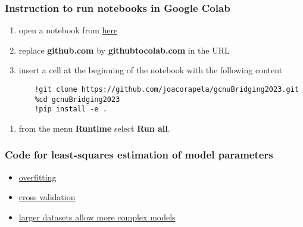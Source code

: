 \documentclass[11pt]{beamer}
\newcounter{saveenumi}
\newcommand{\seti}{\setcounter{saveenumi}{\value{enumi}}}
\newcommand{\conti}{\setcounter{enumi}{\value{saveenumi}}}
\begin{document}
\begin{frame}[fragile]
    \frametitle{Instruction to run notebooks in Google Colab}

    \begin{enumerate}
        \item open a notebook from
            \href{https://github.com/joacorapela/gcnuBridging2023/tree/master/docs/sphinx/build/html/notebooks/auto_examples/bayesianLinearRegression}{here}
        \item replace \textbf{github.com} by \textbf{githubtocolab.com} in the
            URL
        \item insert a cell at the beginning of the notebook with the following
            content
        \seti
    \end{enumerate}

    \tiny
    \begin{verbatim}
       !git clone https://github.com/joacorapela/gcnuBridging2023.git
       %cd gcnuBridging2023
       !pip install -e .
    \end{verbatim}
    \normalsize

    \begin{enumerate}
        \conti
        \item from the menu \textbf{Runtime} select \textbf{Run all}.
    \end{enumerate}
\end{frame}

\begin{frame}
    \frametitle{Code for least-squares estimation of model parameters}

    \begin{itemize}
        \item \href{https://joacorapela.github.io/gcnuBridging2023/auto\_examples/bayesianLinearRegression/plotOverfittingLeastSquares.html\#sphx-glr-auto-examples-bayesianlinearregression-plotoverfittingleastsquares-py}{overfitting}
        \item \href{https://joacorapela.github.io/gcnuBridging2023/auto\_examples/bayesianLinearRegression/plotCrossValidationLeastSquares.html\#sphx-glr-auto-examples-bayesianlinearregression-plotcrossvalidationleastsquares-py}{cross validation}
        \item \href{https://joacorapela.github.io/gcnuBridging2023/auto\_examples/bayesianLinearRegression/plotLackOfOverfittingInLeastSquaresForLargerDatasetSize.html\#sphx-glr-auto-examples-bayesianlinearregression-plotlackofoverfittinginleastsquaresforlargerdatasetsize-py}{larger datasets allow more complex models}
    \end{itemize}

\end{frame}
\end{document}
